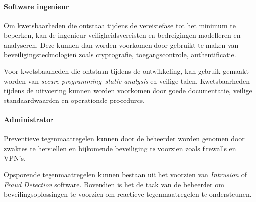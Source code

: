 \documentclass[../main.tex]{subfiles}
\begin{document}
\paragraph{Software ingenieur} 
Om kwetsbaarheden die ontstaan tijdens de vereistefase tot het minimum te beperken, kan de ingenieur veiligheidsvereisten en bedreigingen modelleren en analyseren. Deze kunnen dan worden voorkomen door gebruikt te maken van beveiligingstechnologie\"n zoals cryptografie, toegangscontrole, authentificatie.

Voor kwetsbaarheden die ontstaan tijdens de ontwikkeling, kan gebruik gemaakt worden van \textit{secure programming}, \textit{static analysis} en veilige talen. Kwetsbaarheden tijdens de uitvoering kunnen worden voorkomen door goede documentatie, veilige standaardwaarden en operationele procedures.

\paragraph{Administrator} 
Preventieve tegenmaatregelen kunnen door de beheerder worden genomen door zwaktes te herstellen en bijkomende beveiliging te voorzien zoals firewalls en VPN's. 

Opsporende tegenmaatregelen kunnen bestaan uit het voorzien van \textit{Intrusion} of \textit{Fraud} \textit{Detection} software. Bovendien is het de taak van de beheerder om beveilingsoplossingen te voorzien om reactieve tegenmaatregelen te ondersteunen.
\end{document}
